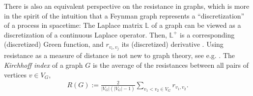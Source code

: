 \documentclass[11pt]{scrartcl}
\numberwithin{equation}{section}
\newcommand{\abs}[1]{\lvert #1 \rvert}
\begin{document}
There is also an equivalent perspective on the resistance in graphs, which is more in the spirit of the intuition that a Feynman graph represents a \enquote{discretization} of a process in spacetime: The Laplace matrix $\mathbb L$ of a graph can be  viewed as a discretization of a continuous Laplace operator. Then, $\mathbb L^+$ is a corresponding (discretized) Green function, and $r_{v_i,v_j}$ its (discretized) derivative  \cite{kassel_transfer_2015}. Using resistance as a measure of distance is not new to graph theory, see e.g. \cite{klein_resistance_1993,kirkland_distances_1997}. 
The \emph{Kirchhoff index} of a graph $G$ is the average of the resistances between all pairs of vertices $v\in V_G$,
\begin{align}\label{def:kirchhoff_index}
	R(G) := \frac{2}{\abs{V_G} \left( \abs{V_G}-1 \right)  }\sum_{v_1 <v_2 \in V_G} r_{v_1,v_2}.
\end{align}
\end{document}
